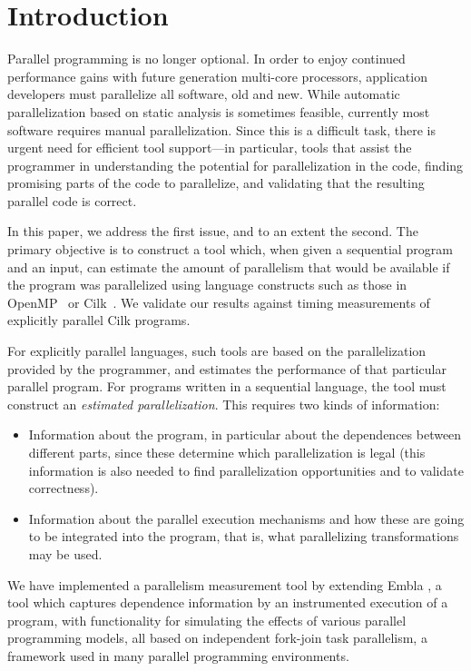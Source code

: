 \section{Introduction}

Parallel programming is no longer optional.  In order to enjoy continued
performance gains with future generation multi-core processors,
application developers must parallelize all software, old and
new.
While automatic parallelization based on static analysis 
is sometimes feasible, currently most software requires manual
parallelization.
Since this is a difficult task, there is urgent need for efficient tool support---in
particular, tools that assist the programmer in understanding the potential 
for parallelization in the code, finding promising parts of the code to parallelize, 
and validating that the resulting parallel code is correct.

In this paper, we address the first issue, and to an extent the second.
The primary objective is to construct a tool
which, when given a sequential program and an input, can estimate the 
amount of parallelism that would be available if the program was parallelized
using language constructs such as those in OpenMP~\cite{dagum98openmp}
or Cilk~\cite{blumofe96cilk}. We validate our results against timing 
measurements of explicitly parallel Cilk programs.

For explicitly parallel languages, 
such tools are based on the parallelization provided by the programmer, and 
estimates the performance of that particular parallel program. For programs written
in a sequential language, the tool must construct
an {\em estimated parallelization}. This requires two kinds of information:
\begin{itemize}
\item
Information about the program, in particular about the dependences between 
different parts, since these determine which parallelization is legal (this 
information is also needed to find parallelization opportunities and to validate
correctness).
\item
Information about the parallel execution mechanisms and how these are going
to be integrated into the program, that is, what parallelizing transformations 
may be used.
\end{itemize}
We have implemented a parallelism measurement tool by extending
Embla \cite{embla:08}, a tool which captures dependence information by an instrumented 
execution of a program, with functionality for simulating the effects of various parallel 
programming models, all based on independent fork-join task parallelism,
a framework used in many parallel programming environments.

